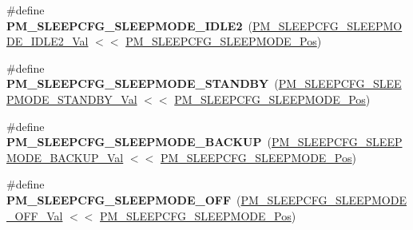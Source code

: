 \begin{DoxyCompactItemize}
\item 
\hypertarget{group___s_a_m_l21___p_m_ga9a836330be53797d5abf38ff55e83b23}{}\#define {\bfseries P\+M\+\_\+\+S\+L\+E\+E\+P\+C\+F\+G\+\_\+\+S\+L\+E\+E\+P\+M\+O\+D\+E\+\_\+\+I\+D\+L\+E2}~(\hyperlink{group___s_a_m_l21___p_m_gaa39bc5c9c9144b45a525dbac465c4603}{P\+M\+\_\+\+S\+L\+E\+E\+P\+C\+F\+G\+\_\+\+S\+L\+E\+E\+P\+M\+O\+D\+E\+\_\+\+I\+D\+L\+E2\+\_\+\+Val} $<$$<$ \hyperlink{group___s_a_m_l21___p_m_ga35bc67c3429373f2ad67992a2c731a59}{P\+M\+\_\+\+S\+L\+E\+E\+P\+C\+F\+G\+\_\+\+S\+L\+E\+E\+P\+M\+O\+D\+E\+\_\+\+Pos})\label{group___s_a_m_l21___p_m_ga9a836330be53797d5abf38ff55e83b23}

\item 
\hypertarget{group___s_a_m_l21___p_m_gaf3e4b652eabb4b9d0b860c8ea3ddb1fe}{}\#define {\bfseries P\+M\+\_\+\+S\+L\+E\+E\+P\+C\+F\+G\+\_\+\+S\+L\+E\+E\+P\+M\+O\+D\+E\+\_\+\+S\+T\+A\+N\+D\+B\+Y}~(\hyperlink{group___s_a_m_l21___p_m_gafad7594ad3c4bf0e456b4686140360c1}{P\+M\+\_\+\+S\+L\+E\+E\+P\+C\+F\+G\+\_\+\+S\+L\+E\+E\+P\+M\+O\+D\+E\+\_\+\+S\+T\+A\+N\+D\+B\+Y\+\_\+\+Val} $<$$<$ \hyperlink{group___s_a_m_l21___p_m_ga35bc67c3429373f2ad67992a2c731a59}{P\+M\+\_\+\+S\+L\+E\+E\+P\+C\+F\+G\+\_\+\+S\+L\+E\+E\+P\+M\+O\+D\+E\+\_\+\+Pos})\label{group___s_a_m_l21___p_m_gaf3e4b652eabb4b9d0b860c8ea3ddb1fe}

\item 
\hypertarget{group___s_a_m_l21___p_m_ga19b25741ba163602903faca0d721c626}{}\#define {\bfseries P\+M\+\_\+\+S\+L\+E\+E\+P\+C\+F\+G\+\_\+\+S\+L\+E\+E\+P\+M\+O\+D\+E\+\_\+\+B\+A\+C\+K\+U\+P}~(\hyperlink{group___s_a_m_l21___p_m_ga4fa413e3dd29c199b7ad62c4f8f533ea}{P\+M\+\_\+\+S\+L\+E\+E\+P\+C\+F\+G\+\_\+\+S\+L\+E\+E\+P\+M\+O\+D\+E\+\_\+\+B\+A\+C\+K\+U\+P\+\_\+\+Val} $<$$<$ \hyperlink{group___s_a_m_l21___p_m_ga35bc67c3429373f2ad67992a2c731a59}{P\+M\+\_\+\+S\+L\+E\+E\+P\+C\+F\+G\+\_\+\+S\+L\+E\+E\+P\+M\+O\+D\+E\+\_\+\+Pos})\label{group___s_a_m_l21___p_m_ga19b25741ba163602903faca0d721c626}

\item 
\hypertarget{group___s_a_m_l21___p_m_gad2a9375ae47433adf7f782d9048228b0}{}\#define {\bfseries P\+M\+\_\+\+S\+L\+E\+E\+P\+C\+F\+G\+\_\+\+S\+L\+E\+E\+P\+M\+O\+D\+E\+\_\+\+O\+F\+F}~(\hyperlink{group___s_a_m_l21___p_m_ga7f882d1a05a4bc12d6b2a16f5556d294}{P\+M\+\_\+\+S\+L\+E\+E\+P\+C\+F\+G\+\_\+\+S\+L\+E\+E\+P\+M\+O\+D\+E\+\_\+\+O\+F\+F\+\_\+\+Val} $<$$<$ \hyperlink{group___s_a_m_l21___p_m_ga35bc67c3429373f2ad67992a2c731a59}{P\+M\+\_\+\+S\+L\+E\+E\+P\+C\+F\+G\+\_\+\+S\+L\+E\+E\+P\+M\+O\+D\+E\+\_\+\+Pos})\label{group___s_a_m_l21___p_m_gad2a9375ae47433adf7f782d9048228b0}


\end{DoxyCompactItemize}

